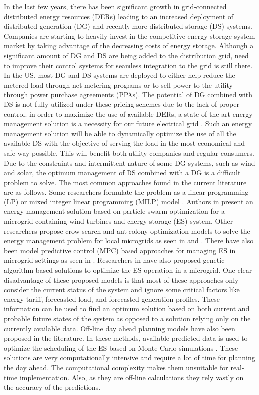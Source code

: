 In the last few years, there has been significant growth in grid-connected distributed energy resources (DERs) leading to an increased deployment of distributed generation (DG) and recently more distributed storage (DS) systems. Companies are starting to heavily invest in the competitive energy storage system market by taking advantage of the decreasing costs of energy storage. Although a significant amount of DG and DS are being added to the distribution grid, need to improve their control systems for seamless integration to the grid is still there. In the US, most DG and DS systems are deployed to either help reduce the metered load through net-metering programs or to sell power to the utility through power purchase agreements (PPAs). The potential of DG combined with DS is not fully utilized under these pricing schemes due to the lack of proper control. in order to maximize the use of available DERs, a state-of-the-art energy management solution is a necessity for our future electrical grid . Such an energy management solution will be able to dynamically optimize the use of all the available DS with the objective of serving the load in the most economical and safe way possible. This will benefit both utility companies and regular consumers. Due to the constraints and intermittent nature of some DG systems, such as wind and solar, the optimum management of DS combined with a DG is a difficult problem to solve. The most common approaches found in the current literature are as follows. Some researchers formulate the problem as a linear programming (LP) or mixed integer linear programming (MILP) model \cite{lp73, lp74, lp75}. Authors in \cite{pso80, pso81} present an energy management solution based on particle swarm optimization for a microgrid containing wind turbines and energy storage (ES) system. Other researchers propose crow-search and ant colony optimization models to solve the energy management problem for local microgrids as seen in \cite{csa87} and \cite{aco84}. There have also been model predictive control (MPC) based approaches for managing ES in microgrid settings as seen in \cite{energymanajaboulay,mpcmorstyn}.  Researchers in \cite{ga76, ga77} have also proposed genetic algorithm based solutions to optimize the ES operation in a microgrid. One clear disadvantage of these proposed models is that most of these approaches only consider the current status of the system and ignore some critical factors like energy tariff, forecasted load, and forecasted generation profiles.  These information can be used to find an optimum solution based on both current and probable future states of the system as opposed to a solution relying only on the currently available data. Off-line day ahead planning models have also been proposed in the literature. In these methods, available predicted data is used to optimize the scheduling of the ES based on Monte Carlo simulations \cite{6872821,7010943,6839110}. These solutions are very computationally intensive and require a lot of time for planning the day ahead. The computational complexity makes them unsuitable for real-time implementation. Also, as they are off-line calculations they rely vastly on the accuracy of the predictions.

